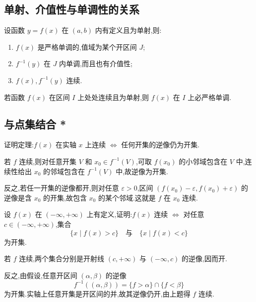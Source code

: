 \subsection{单射、介值性与单调性的关系}

\begin{proposition}[\markstar]
    设函数 $y=f(x)$ 在 $(a,b)$ 内有定义且为单射,则:
    \begin{enumerate}
        \item $f(x)$ 是严格单调的,值域为某个开区间 $J$;
        \item $f^{-1}(y)$ 在 $J$ 内单调,而且也有介值性;
        \item $f(x),f^{-1}(y)$ 连续.
    \end{enumerate}
\end{proposition}

\begin{corollary}[\markstar]
    若函数 $f(x)$ 在区间 $I$ 上处处连续且为单射,则 $f(x)$ 在 $I$ 上必严格单调.
\end{corollary}



\subsection{与点集结合 *}

\begin{example}
    证明定理:$f(x)$ 在实轴 $x$ 上连续 $\Longleftrightarrow$ 任何开集的逆像仍为开集.
\end{example}
\exampleblank

\begin{solution}
    若 $f$ 连续,则对任意开集 $V$ 和 $x_0\in f^{-1}(V)$,可取 $f(x_0)$ 的小邻域包含在 $V$ 中,连续性给出 $x_0$ 的邻域包含在 $f^{-1}(V)$ 中,故逆像为开集.

    反之,若任一开集的逆像都开,则对任意 $\varepsilon>0$,区间 $(f(x_0)-\varepsilon,f(x_0)+\varepsilon)$ 的逆像是含 $x_0$ 的开集,故包含 $x_0$ 的某个邻域.这就是 $f$ 在 $x_0$ 连续.
\end{solution}

\begin{example}
    设 $f(x)$ 在 $(-\infty,+\infty)$ 上有定义,证明:$f(x)$ 连续 $\Longleftrightarrow$ 对任意 $c\in(-\infty,+\infty)$,集合
    \[
        \{x\mid f(x)>c\}
        \quad\text{与}\quad
        \{x\mid f(x)<c\}
    \]
    为开集.
\end{example}
\exampleblank

\begin{solution}
    若 $f$ 连续,两个集合分别是开射线 $(c,+\infty)$ 与 $(-\infty,c)$ 的逆像,因而开.

    反之,由假设,任意开区间 $(\alpha,\beta)$ 的逆像
    \[
        f^{-1}((\alpha,\beta))=\{f>\alpha\}\cap\{f<\beta\}
    \]
    为开集.实轴上任意开集是开区间的并,故其逆像仍开,由上题得 $f$ 连续.
\end{solution}

